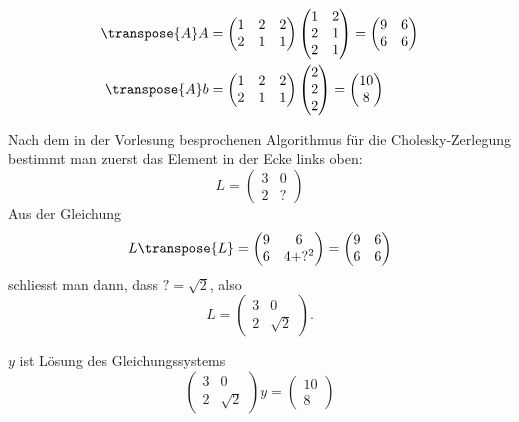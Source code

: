 \begin{loesung}
\begin{teilaufgaben}
\item
\begin{align*}
\transpose{A}A&=
\begin{pmatrix}1&2&2\\2&1&1\end{pmatrix}
\begin{pmatrix}1&2\\2&1\\2&1\end{pmatrix}
=
\begin{pmatrix}
9&6\\
6&6
\end{pmatrix}
\\
\transpose{A}b&=
\begin{pmatrix}1&2&2\\2&1&1\end{pmatrix}
\begin{pmatrix}2\\2\\2\end{pmatrix}
=
\begin{pmatrix}
10\\8
\end{pmatrix}
\end{align*}
\item Nach dem in der Vorlesung besprochenen Algorithmus für die
Cholesky-Zerlegung bestimmt man zuerst das Element in der Ecke
links oben:
\[
L=\begin{pmatrix}
3&0\\
2&?
\end{pmatrix}
\]
Aus der Gleichung
\[
L\transpose{L}
=
\begin{pmatrix}9&6\\6&4+?^2\end{pmatrix}=\begin{pmatrix}9&6\\6&6\end{pmatrix}
\]
schliesst man dann, dass $?=\sqrt{2}$, also
\[
L=\begin{pmatrix}
3&0\\2&\sqrt{2}
\end{pmatrix}.
\]
\item $y$ ist Lösung des Gleichungssystems
\[
\begin{pmatrix}
3&0\\
2&\sqrt{2}
\end{pmatrix}y=\begin{pmatrix}10\\8\end{pmatrix}
\]
\end{teilaufgaben}
\end{loesung}
